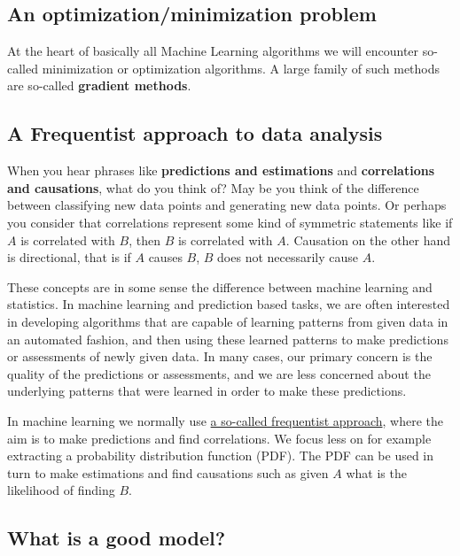 \documentclass[%
oneside,                 %
final,                   %
10pt]{article}
\begin{document}
\noindent




\subsection*{An optimization/minimization problem}

At the heart of basically all Machine Learning algorithms we will encounter so-called minimization or optimization algorithms. A large family of such methods are so-called \textbf{gradient methods}.

\subsection*{A Frequentist approach to data analysis}

When you hear phrases like \textbf{predictions and estimations} and
\textbf{correlations and causations}, what do you think of?  May be you think
of the difference between classifying new data points and generating
new data points.
Or perhaps you consider that correlations represent some kind of symmetric statements like
if $A$ is correlated with $B$, then $B$ is correlated with
$A$. Causation on the other hand is directional, that is if $A$ causes $B$, $B$ does not
necessarily cause $A$.

These concepts are in some sense the difference between machine
learning and statistics. In machine learning and prediction based
tasks, we are often interested in developing algorithms that are
capable of learning patterns from given data in an automated fashion,
and then using these learned patterns to make predictions or
assessments of newly given data. In many cases, our primary concern
is the quality of the predictions or assessments, and we are less
concerned about the underlying patterns that were learned in order
to make these predictions.

In machine learning we normally use \href{{https://en.wikipedia.org/wiki/Frequentist_inference}}{a so-called frequentist approach},
where the aim is to make predictions and find correlations. We focus
less on for example extracting a probability distribution function (PDF). The PDF can be
used in turn to make estimations and find causations such as given $A$
what is the likelihood of finding $B$.


\subsection*{What is a good model?}
\end{document}
